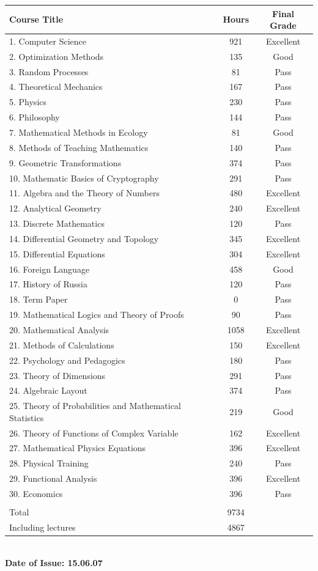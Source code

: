 \documentclass{article}
\begin{document}
\begin{tabular}{|l|c|c|}
\hline
Course Title & Hours & Final Grade\\\hline
1.	Computer Science & 921 & Excellent\\
2.	Optimization Methods & 135 & Good\\
3.	Random Processes & 81 & Pass\\
4.	Theoretical Mechanics & 167 & Pass\\
5.	Physics & 230 & Pass\\
6.	Philosophy & 144 & Pass\\
7.	Mathematical Methods in Ecology & 81 & Good\\
8.	Methods of Teaching Mathematics & 140 & Pass\\
9.	Geometric Transformations & 374 & Pass\\
10.	Mathematic Basics of Cryptography & 291 & Pass\\
11.	Algebra and the Theory of Numbers & 480 & Excellent\\
12.	Analytical Geometry & 240 & Excellent\\
13.	Discrete Mathematics & 120 & Pass\\
14.	Differential Geometry and Topology & 345 & Excellent\\
15.	Differential Equations & 304 & Excellent\\
16.	Foreign Language & 458 & Good\\
17.	History of Russia & 120 & Pass\\
18.	Term Paper & 0 & Pass\\
19.	Mathematical Logics and Theory of Proofs & 90 & Pass\\
20.	Mathematical Analysis & 1058 & Excellent\\
21.	Methods of Calculations & 150 & Excellent\\
22.	Psychology and Pedagogics & 180 & Pass\\
23.	Theory of Dimensions & 291 & Pass\\
24.	Algebraic Layout & 374 & Pass\\
25.	Theory of Probabilities and Mathematical Statistics & 219 & Good\\
26.	Theory of Functions of Complex Variable & 162 & Excellent\\
27.	Mathematical Physics Equations & 396 & Excellent\\
28.	Physical Training & 240 & Pass\\
29.	Functional Analysis & 396 & Excellent\\
30.	Economics & 396 & Pass\\
\dotfill & &\\
Total & 9734 &\\
Including lectures & 4867 &\\\hline
\end{tabular}\\

\textbf{Date of Issue: 15.06.07}
\end{document}
